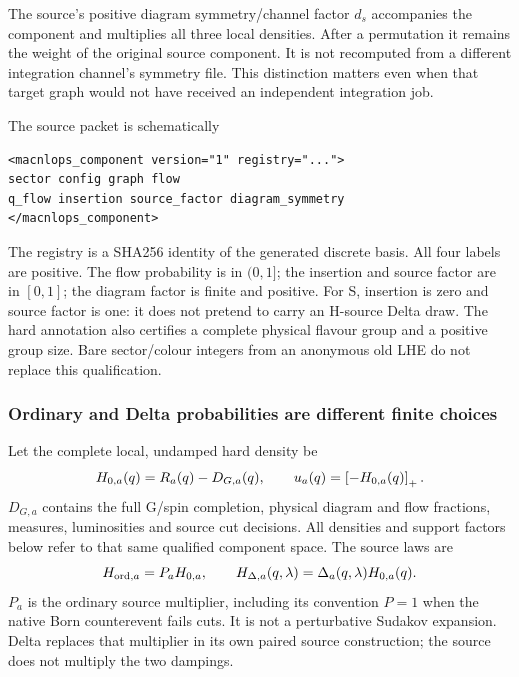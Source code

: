 The source's positive diagram symmetry/channel factor $d_s$ accompanies
the component and multiplies all three local densities. After a
permutation it remains the weight of the original source component.
It is not recomputed from a different integration channel's symmetry
file. This distinction matters even when that target graph would not
have received an independent integration job.

The source packet is schematically
\begin{lstlisting}
<macnlops_component version="1" registry="...">
sector config graph flow
q_flow insertion source_factor diagram_symmetry
</macnlops_component>
\end{lstlisting}
The registry is a SHA256 identity of the generated discrete basis.
All four labels are positive. The flow probability is in $(0,1]$;
the insertion and source factor are in $[0,1]$; the diagram factor is
finite and positive. For S, insertion is zero and source factor is one:
it does not pretend to carry an H-source Delta draw. The hard annotation
also certifies a complete physical flavour group and a positive group
size. Bare sector/colour integers from an anonymous old LHE do not
replace this qualification.

\subsubsection{Ordinary and Delta probabilities are different finite choices}

Let the complete local, undamped hard density be
\begin{equation}
 H_{0,a}(q)=R_a(q)-D_{G,a}(q),\qquad
 u_a(q)=\left[-H_{0,a}(q)\right]_+.
 \label{eq:component-h0}
\end{equation}
$D_{G,a}$ contains the full G/spin completion, physical diagram and flow
fractions, measures, luminosities and source cut decisions. All densities
and support factors below refer to that same qualified component space.
The source laws are
\begin{equation}
 H_{{\rm ord},a}=P_aH_{0,a},\qquad
 H_{\Delta,a}(q,\lambda)=\Delta_a(q,\lambda)H_{0,a}(q).
 \label{eq:component-source-laws}
\end{equation}
$P_a$ is the ordinary source multiplier, including its convention $P=1$
when the native Born counterevent fails cuts. It is not a perturbative
Sudakov expansion. Delta replaces that multiplier in its own paired
source construction; the source does not multiply the two dampings.

